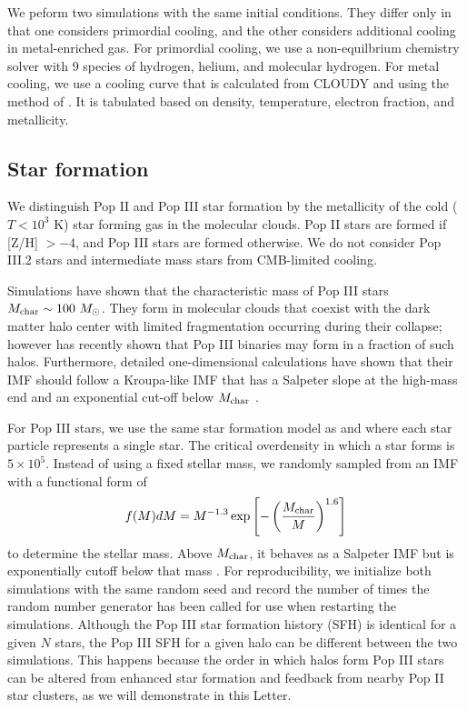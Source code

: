 \documentclass[apjl]{emulateapj}
\begin{document}
We peform two simulations with the same initial conditions.  They
differ only in that one considers primordial cooling, and the other
considers additional cooling in metal-enriched gas.  For primordial
cooling, we use a non-equilbrium chemistry solver with 9 species of
hydrogen, helium, and molecular hydrogen.  For metal cooling, we use a
cooling curve that is calculated from CLOUDY \citep{CLOUDY} and using
the method of \citet{2008MNRAS.385.1443S}.  It is tabulated based on
density, temperature, electron fraction, and metallicity.

\subsection{Star formation}

We distinguish Pop II and Pop III star formation by the metallicity of
the cold ($T < 10^3$ K) star forming gas in the molecular clouds.  Pop
II stars are formed if [Z/H] $> -4$, and Pop III stars are formed
otherwise.  We do not consider Pop III.2 stars and intermediate mass
stars from CMB-limited cooling.

Simulations have shown that the characteristic mass of Pop III stars
$M_{\rm char} \sim 100~\Ms$.  They form in molecular clouds that
coexist with the dark matter halo center with limited fragmentation
occurring during their collapse; however \citet{2009Sci...325..601T}
has recently shown that Pop III binaries may form in a fraction of
such halos.  Furthermore, detailed one-dimensional calculations have
shown that their IMF should follow a Kroupa-like IMF that has a
Salpeter slope at the high-mass end and an exponential cut-off below
$M_{\rm char}$ \citep{refs}.

For Pop III stars, we use the same star formation model as
\citet{Abel07} and \citet{Wise08_Gal} where each star particle
represents a single star.  The critical overdensity in which a star
forms is $5 \times 10^5$.  Instead of using a fixed stellar mass, we
randomly sampled from an IMF with a functional form of
%
\begin{equation}
\label{eqn:imf}
f(M)dM = M^{-1.3} \exp\left[-\left(\frac{M_{\rm char}}{M}\right)^{1.6}\right]
\end{equation}
to determine the stellar mass.  Above $M_{\rm char}$, it behaves as a
Salpeter IMF but is exponentially cutoff below that mass
\citep{Chabrier03, Clark09}.  For reproducibility, we initialize both
simulations with the same random seed and record the number of times
the random number generator \citep[Mersenne twister;][]{ref} has been
called for use when restarting the simulations.  Although the Pop III
star formation history (SFH) is identical for a given $N$ stars, the
Pop III SFH for a given halo can be different between the two
simulations.  This happens because the order in which halos form Pop
III stars can be altered from enhanced star formation and feedback
from nearby Pop II star clusters, as we will demonstrate in this
Letter.
\end{document}
